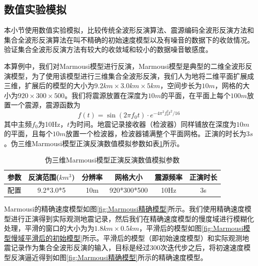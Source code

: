 \documentclass[degree=doctor]{thuthesis}
\begin{document}
\subsection{数值实验模拟}
本小节使用数值实验模拟，比较传统全波形反演算法、震源编码全波形反演方法和集合全波形反演算法在叫不精确的初始速度模型以及有噪音的数据下的收敛情况。验证集合全波形反演方法有较大的收敛域和较小的数据噪音敏感度。

本算例中，我们对Marmousi模型进行反演，Marmousi模型是典型的二维全波形反演模型，为了使用该模型进行三维集合全波形反演，我们人为地将二维平面扩展成三维，扩展后的模型的大小为$9.2km\times 3.0km \times 5km$，空间步长为$10m$，网格的大小为$920\times 300 \times 500$。我们将震源放置在深度为$10m$的平面，在平面上每个$100m$放置一个震源，震源函数为
\begin{equation}
  f(t)=\sin(2\pi f_0t)\cdot e^{-4\pi^2f_0^2t^2/16}
\end{equation}
其中主频$f_0$为10Hz，$t$为时间。地震记录接收器（检波器）同样铺放在深度为$10m$的平面，且每个$10m$放置一个检波器，检波器铺满整个平面网格。正演的时长为$3s$。伪三维Marmousi模型正演反演数值模拟参数如表\ref{tb:伪三维Marmousi模型正演反演数值模拟参数}所示。

\begin{table}[ht]
\centering
\caption{伪三维Marmousi模型正演反演数值模拟参数}
\label{tb:伪三维Marmousi模型正演反演数值模拟参数}
\begin{tabular}{cccccc}
\hline
参数 & 反演范围($km^3$) & 分辨率 & 网格大小        & 震源频率 & 正演时长 \\\hline 
配置 & 9.2*3.0*5     & 10m   & 920*300*500   & 10Hz    & 3s  \\\hline
\end{tabular}
\end{table}

Marmousi的精确速度模型如图\ref{fig:Marmousi精确模型}所示。我们使用精确速度模型进行正演得到实际观测地震记录，然后我们在精确速度模型的慢度域进行模糊化处理，平滑的窗口的大小为为$1.8km\times 0.5km$，平滑后的模型如图\ref{fig:Marmousi模型慢域平滑后的初始模型}所示。平滑后的模型（即初始速度模型）和实际观测地震记录作为集合全波形反演的输入，目标是经过300次迭代步之后，将初速速度模型反演逼近得到如图\ref{fig:Marmousi精确模型}所示的精确速度模型。
\end{document}
